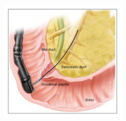 \documentclass{beamer}
\begin{document}
\begin{frame}
\begin{columns}
        \begin{column}{0.65\textwidth}
            \vspace{0.1\textwidth}


            \vspace{0.02\textwidth}
            \begin{columns}

                \begin{column}{0.5\textwidth}
        
        
                    \begin{figure}[H]
                        \centering
                        \includegraphics[width=0.6\textwidth]{figures/ERCP.jpg}
                    \end{figure}
                \end{column}

                \hspace{-0.15\textwidth}
                    
                
                    \begin{column}{0.5\textwidth}
        
            

\end{column}
\end{columns}
\end{column}
\end{columns}
\end{frame}
\end{document}
